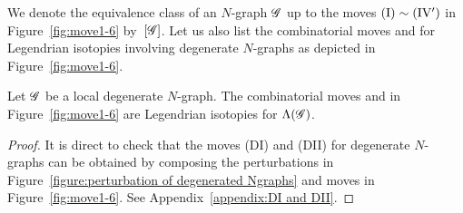 We denote the equivalence class of an $N$-graph $\mathscr{G}$ up to the moves ${\rm{(I)}}\sim {\rm{(IV')}}$ in Figure~\ref{fig:move1-6} by~$[\mathscr{G}]$.
Let us also list the combinatorial moves  and  for Legendrian isotopies involving degenerate $N$-graphs as depicted in Figure~\ref{fig:move1-6}.

\begin{corollary}
Let $\mathscr{G}$ be a local degenerate $N$-graph. The combinatorial moves  and  in Figure~\ref{fig:move1-6} are Legendrian isotopies for $\Lambda(\mathscr{G})$.
\end{corollary}

\begin{proof}
It is direct to check that the moves (DI) and (DII) for degenerate $N$-graphs can be obtained by composing the perturbations in Figure~\ref{figure:perturbation of degenerated Ngraphs} and moves in Figure~\ref{fig:move1-6}. See Appendix~\ref{appendix:DI and DII}.
\end{proof}



